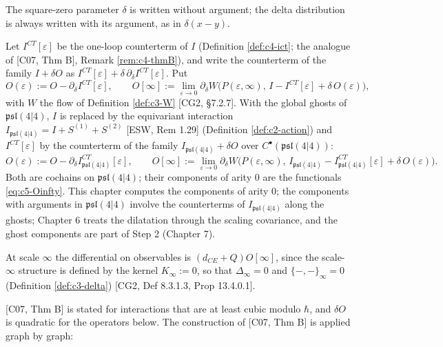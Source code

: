 The square-zero parameter $\delta$ is written without argument; the delta distribution is always written with its argument, as in $\delta(x-y)$.

\begin{definition}
\label{def:c5-Oeps}
Let $I^{CT}[\varepsilon]$ be the one-loop counterterm of $I$ (Definition \ref{def:c4-ict}; the analogue of [C07, Thm B], Remark \ref{rem:c4-thmB}), and write the counterterm of the family $I+\delta O$ as $I^{CT}[\varepsilon]+\delta\,\partial_\delta I^{CT}[\varepsilon]$. Put
\begin{equation}
O(\varepsilon):=O-\partial_\delta I^{CT}[\varepsilon],\qquad O[\infty]:=\lim_{\varepsilon\to0}\partial_\delta W\big(P(\varepsilon,\infty),\,I-I^{CT}[\varepsilon]+\delta\,O(\varepsilon)\big),
\label{eq:c5-Oinfty}
\end{equation}
with $W$ the flow of Definition \ref{def:c3-W} [CG2, §7.2.7]. With the global ghosts of $\mathfrak{psl}(4|4)$, $I$ is replaced by the equivariant interaction $I_{\mathfrak{psl}(4|4)}=I+S^{(1)}+S^{(2)}$ [ESW, Rem 1.29] (Definition \ref{def:c2-action}) and $I^{CT}[\varepsilon]$ by the counterterm of the family $I_{\mathfrak{psl}(4|4)}+\delta O$ over $C^\bullet(\mathfrak{psl}(4|4))$:
\[
O(\varepsilon):=O-\partial_\delta I^{CT}_{\mathfrak{psl}(4|4)}[\varepsilon],\qquad O[\infty]:=\lim_{\varepsilon\to0}\partial_\delta W\big(P(\varepsilon,\infty),\,I_{\mathfrak{psl}(4|4)}-I^{CT}_{\mathfrak{psl}(4|4)}[\varepsilon]+\delta\,O(\varepsilon)\big).
\]
Both are cochains on $\mathfrak{psl}(4|4)$; their components of arity $0$ are the functionals \eqref{eq:c5-Oinfty}. This chapter computes the components of arity $0$; the components with arguments in $\mathfrak{psl}(4|4)$ involve the counterterms of $I_{\mathfrak{psl}(4|4)}$ along the ghosts; Chapter 6 treats the dilatation through the scaling covariance, and the ghost components are part of Step 2 (Chapter 7).
\end{definition}

At scale $\infty$ the differential on observables is $(d_{CE}+Q)O[\infty]$, since the scale-$\infty$ structure is defined by the kernel $K_\infty:=0$, so that $\Delta_\infty=0$ and $\{-,-\}_\infty=0$ (Definition \ref{def:c3-delta}) [CG2, Def 8.3.1.3, Prop 13.4.0.1].

[C07, Thm B] is stated for interactions that are at least cubic modulo $\hbar$, and $\delta O$ is quadratic for the operators below. The construction of [C07, Thm B] is applied graph by graph:

